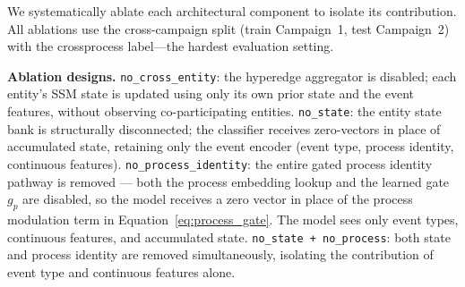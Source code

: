 \documentclass[letterpaper,twocolumn,10pt]{article}
\begin{document}
We systematically ablate each architectural component to isolate its contribution. All ablations use the cross-campaign split (train Campaign~1, test Campaign~2) with the crossprocess label---the hardest evaluation setting.

\textbf{Ablation designs.} \texttt{no\_cross\_entity}: the hyperedge aggregator is disabled; each entity's SSM state is updated using only its own prior state and the event features, without observing co-participating entities. \texttt{no\_state}: the entity state bank is structurally disconnected; the classifier receives zero-vectors in place of accumulated state, retaining only the event encoder (event type, process identity, continuous features). \texttt{no\_process\_identity}: the entire gated process identity pathway is removed --- both the process embedding lookup and the learned gate $g_p$ are disabled, so the model receives a zero vector in place of the process modulation term in Equation~\ref{eq:process_gate}. The model sees only event types, continuous features, and accumulated state. \texttt{no\_state + no\_process}: both state and process identity are removed simultaneously, isolating the contribution of event type and continuous features alone.

\begin{table}[t]
    \centering
    \caption{Component ablation (cross-campaign split, crossprocess label). Each row removes one or more components from the full model. $\Delta$ is the relative change in event AUPRC.}
    \label{tab:ablation_unified}
\end{table}


\end{document}
